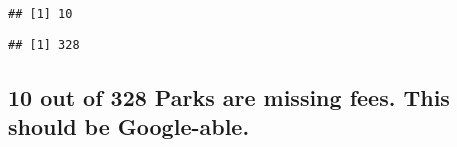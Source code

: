 \documentclass[
]{article}
\newenvironment{Shaded}{\begin{snugshade}}{\end{snugshade}}
\newcommand{\KeywordTok}[1]{\textcolor[rgb]{0.13,0.29,0.53}{\textbf{#1}}}
\newcommand{\NormalTok}[1]{#1}
\newcommand{\OperatorTok}[1]{\textcolor[rgb]{0.81,0.36,0.00}{\textbf{#1}}}
\newcommand{\StringTok}[1]{\textcolor[rgb]{0.31,0.60,0.02}{#1}}
\begin{document}
\begin{Shaded}
\end{Shaded}

\begin{verbatim}
## [1] 10
\end{verbatim}

\begin{Shaded}
\end{Shaded}

\begin{verbatim}
## [1] 328
\end{verbatim}

\hypertarget{out-of-328-parks-are-missing-fees.-this-should-be-google-able.}{%
\subsection{10 out of 328 Parks are missing fees. This should be
Google-able.}\label{out-of-328-parks-are-missing-fees.-this-should-be-google-able.}}
\end{document}
